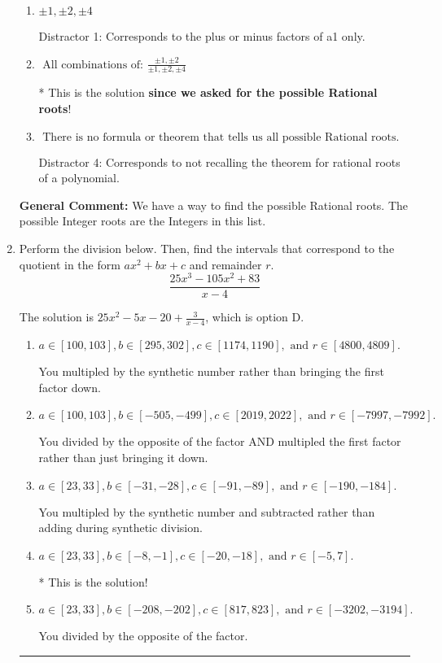 \documentclass{extbook}[14pt]
\newcommand{\litem}[1]{\item #1

\rule{\textwidth}{0.4pt}}
\begin{document}
\begin{enumerate}
{\begin{enumerate}[label=\Alph*.]
This would have been the solution \textbf{if asked for the possible Integer roots}!
\item \( \pm 1,\pm 2,\pm 4 \)

 Distractor 1: Corresponds to the plus or minus factors of a1 only.
\item \( \text{ All combinations of: }\frac{\pm 1,\pm 2}{\pm 1,\pm 2,\pm 4} \)

* This is the solution \textbf{since we asked for the possible Rational roots}!
\item \( \text{ There is no formula or theorem that tells us all possible Rational roots.} \)

 Distractor 4: Corresponds to not recalling the theorem for rational roots of a polynomial.
\end{enumerate}

\textbf{General Comment:} We have a way to find the possible Rational roots. The possible Integer roots are the Integers in this list.
}
\litem{
Perform the division below. Then, find the intervals that correspond to the quotient in the form $ax^2+bx+c$ and remainder $r$.
\[ \frac{25x^{3} -105 x^{2} + 83}{x -4} \]

The solution is \( 25x^{2} -5 x -20 + \frac{3}{x -4} \), which is option D.\begin{enumerate}[label=\Alph*.]
\item \( a \in [100, 103], b \in [295, 302], c \in [1174, 1190], \text{ and } r \in [4800, 4809]. \)

 You multipled by the synthetic number rather than bringing the first factor down.
\item \( a \in [100, 103], b \in [-505, -499], c \in [2019, 2022], \text{ and } r \in [-7997, -7992]. \)

 You divided by the opposite of the factor AND multipled the first factor rather than just bringing it down.
\item \( a \in [23, 33], b \in [-31, -28], c \in [-91, -89], \text{ and } r \in [-190, -184]. \)

 You multipled by the synthetic number and subtracted rather than adding during synthetic division.
\item \( a \in [23, 33], b \in [-8, -1], c \in [-20, -18], \text{ and } r \in [-5, 7]. \)

* This is the solution!
\item \( a \in [23, 33], b \in [-208, -202], c \in [817, 823], \text{ and } r \in [-3202, -3194]. \)

 You divided by the opposite of the factor.
\end{enumerate}

}
\end{enumerate}
\end{document}
